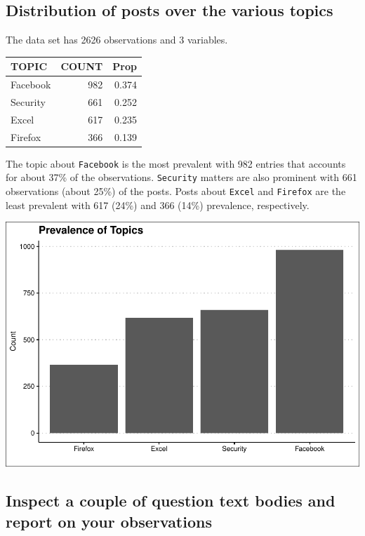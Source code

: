 \documentclass[
]{article}
\begin{document}
\hypertarget{distribution-of-posts-over-the-various-topics}{%
\subsection{Distribution of posts over the various
topics}\label{distribution-of-posts-over-the-various-topics}}

The data set has 2626 observations and 3 variables.

\begin{longtable}{lrr}
\toprule
TOPIC & COUNT & Prop \\ 
\midrule\addlinespace[2.5pt]
Facebook & 982 & 0.374 \\ 
Security & 661 & 0.252 \\ 
Excel & 617 & 0.235 \\ 
Firefox & 366 & 0.139 \\ 
\bottomrule
\end{longtable}

The topic about \texttt{Facebook} is the most prevalent with 982 entries
that accounts for about 37\% of the observations. \texttt{Security}
matters are also prominent with 661 observations (about 25\%) of the
posts. Posts about \texttt{Excel} and \texttt{Firefox} are the least
prevalent with 617 (24\%) and 366 (14\%) prevalence, respectively.

\includegraphics{assign6_files/figure-latex/unnamed-chunk-5-1.pdf}

\hypertarget{inspect-a-couple-of-question-text-bodies-and-report-on-your-observations}{%
\subsection{Inspect a couple of question text bodies and report on your
observations}\label{inspect-a-couple-of-question-text-bodies-and-report-on-your-observations}}
\end{document}
